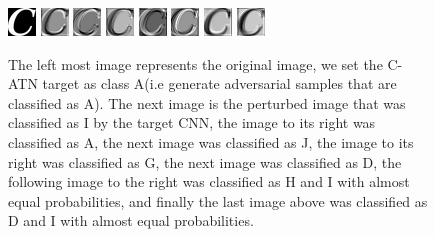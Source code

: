 \documentclass[12pt, conference, letterpaper]{IEEEtran}
\begin{document}
{{{{{{{{{{{{{{\begin{figure}[h]
\includegraphics[scale=1.0]{pictures/original_C.png}
\includegraphics[scale=1.0]{pictures/C_class_as_I.png}
\includegraphics[scale=1.0]{pictures/C_class_as_A.png}
\includegraphics[scale=1.0]{pictures/C_class_as_J.png}
\includegraphics[scale=1.0]{pictures/C_class_as_G.png}
\includegraphics[scale=1.0]{pictures/C_class_as_D.png}
\includegraphics[scale=1.0]{pictures/C_class_as_H_and_I.png}
\includegraphics[scale=1.0]{pictures/C_class_as_D_and_I.png}



\caption{The left most image represents the original image, we set the C-ATN target as class A(i.e generate adversarial samples that are classified as A). The next image is the perturbed image that was classified as I by the target CNN, the image to its right was classified as A, the next image was classified as J, the image to its right was classified as G, the next image was classified as D, the following image to the right was classified as H and I with almost equal probabilities, and finally the last image above was classified as D and I with almost equal probabilities.  }
\end{figure} 

}}}}}}}}}}}}}}
\end{document}
